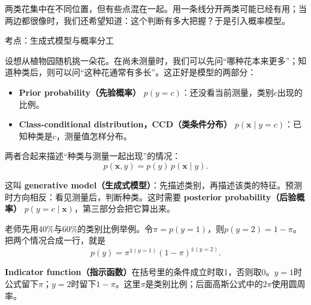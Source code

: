 

两类花集中在不同位置，但有些点混在一起。用一条线分开两类可能已经有用；当两边都很像时，我们还希望知道：这个判断有多大把握？于是引入概率模型。








考点：生成式模型与概率分工

设想从植物园随机挑一朵花。在尚未测量时，我们可以先问“哪种花本来更多”；知道种类后，则可以问“这种花通常有多长”。这正好是模型的两部分：



\begin{itemize}

\item \textbf{Prior probability（先验概率）} \(p(y=c)\)：还没看当前测量，类别\(c\)出现的比例。

\item \textbf{Class-conditional distribution，CCD（类条件分布）} \(p(\mathbf{x}\mid y=c)\)：已知种类是\(c\)，测量值怎样分布。

\end{itemize}


两者合起来描述“种类与测量一起出现”的情况：
\[
p(\mathbf{x},y)=p(y)\,p(\mathbf{x}\mid y).
\tag{2.2}
\]


这叫 \textbf{generative model（生成式模型）}：先描述类别，再描述该类的特征。预测时方向相反：看见测量后，判断种类。这时需要 \textbf{posterior probability（后验概率）} \(p(y=c\mid\mathbf{x})\)，第三部分会把它算出来。


老师先用40\%与60\%的类别比例举例。令\(\pi=p(y=1)\)，则\(p(y=2)=1-\pi\)。把两个情况合成一行，就是
\[
p(y)=\pi^{\mathbb 1(y=1)}(1-\pi)^{\mathbb 1(y=2)}.
\tag{2.3}
\]


\textbf{Indicator function（指示函数）}在括号里的条件成立时取1，否则取0。\(y=1\)时公式留下\(\pi\)；\(y=2\)时留下\(1-\pi\)。这里\(\pi\)是类别比例；后面高斯公式中的\(2\pi\)使用圆周率。






